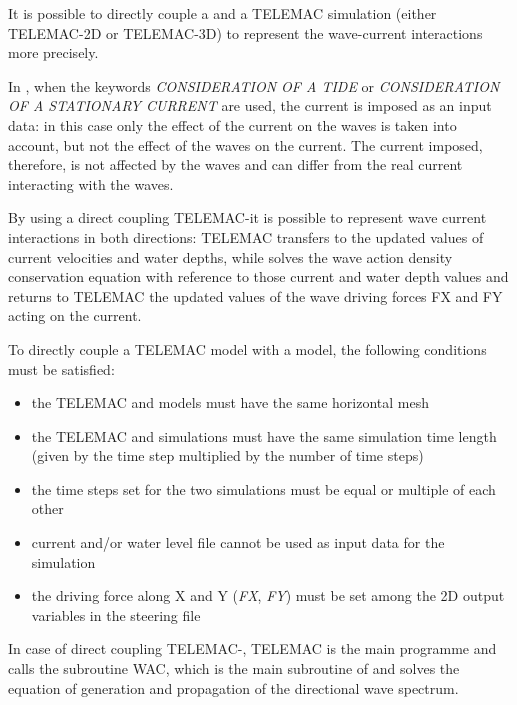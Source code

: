  It is possible to directly couple a \tomawac and a TELEMAC simulation (either TELEMAC-2D or TELEMAC-3D) to represent the wave-current interactions more precisely.

 In \tomawac, when the keywords \textit{CONSIDERATION OF A TIDE} or \textit{CONSIDERATION OF A STATIONARY CURRENT} are used, the current is imposed as an input data: in this case only the effect of the current on the waves is taken into account, but not the effect of the waves on the current. The current imposed, therefore, is not affected by the waves and can differ from the real current interacting with the waves.

 By using a direct coupling TELEMAC-\tomawac it is possible to represent wave current interactions in both directions: TELEMAC transfers to \tomawac the updated values of current velocities and water depths, while \tomawac solves the wave action density conservation equation with reference to those current and water depth values and returns to TELEMAC the updated values of the wave driving forces FX and FY acting on the current.

 To directly couple a TELEMAC model with a \tomawac model, the following conditions must be satisfied:

\begin{itemize}
\item  the TELEMAC and \tomawac models must have the same horizontal mesh

\item  the TELEMAC and \tomawac simulations must have the same simulation time length (given by the time step multiplied by the number of time steps)

\item  the time steps set for the two simulations must be equal or multiple of each other

\item  current and/or water level file cannot be used as input data for the \tomawac simulation

\item  the driving force along X and Y (\textit{FX}, \textit{FY}) must be set among the 2D output variables in the steering file
\end{itemize}

 In case of direct coupling TELEMAC-\tomawac, TELEMAC is the main programme and calls the \tomawac subroutine WAC, which is the main subroutine of \tomawac and solves the equation of generation and propagation of the directional wave spectrum.

